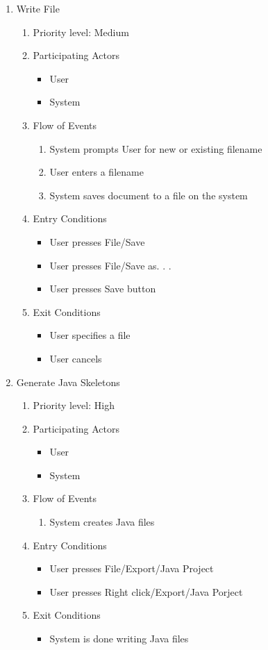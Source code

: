 \documentclass[a4paper, 12pt]{article}
\begin{document}
\begin{enumerate}
\item Write File
  \begin {enumerate}
  \item Priority level: Medium
  \item Participating Actors
    \begin {itemize}
    \item User
    \item System
    \end {itemize}
  \item Flow of Events
    \begin {enumerate}
    \item System prompts User for new or existing filename
    \item User enters a filename
    \item System saves document to a file on the system
    \end {enumerate}
  \item Entry Conditions
    \begin {itemize}
    \item User presses File/Save
    \item User presses File/Save as. . .
    \item User presses Save button
    \end {itemize}
  \item Exit Conditions
    \begin {itemize}
    \item User specifies a file
    \item User cancels
    \end {itemize}
  \end {enumerate}



\item Generate Java Skeletons
  \begin {enumerate}
  \item Priority level: High
  \item Participating Actors
    \begin {itemize}
    \item User
    \item System
    \end {itemize}
  \item Flow of Events
    \begin {enumerate}
    \item System creates Java files
    \end {enumerate}
  \item Entry Conditions
    \begin {itemize}
    \item User presses File/Export/Java Project
    \item User presses Right click/Export/Java Porject
    \end {itemize}
  \item Exit Conditions
    \begin {itemize}
    \item System is done writing Java files
    \end{itemize}
  \end {enumerate}


\end{enumerate}
\end{document}
